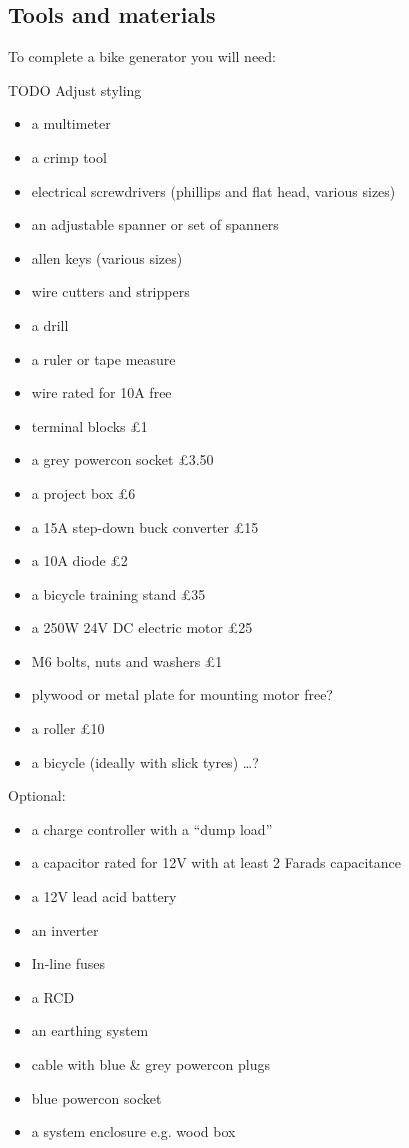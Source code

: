 \documentclass{article}
\theoremstyle{definition}
\theoremstyle{definition}
\theoremstyle{remark}
\begin{document}

  \subsection{Tools and materials} %
  \label{sub:tools_and_materials}

    To complete a bike generator you will need: 

    TODO Adjust styling

    \begin{itemize}
      \item a multimeter
      \item a crimp tool
      \item electrical screwdrivers (phillips and flat head, various sizes)
      \item an adjustable spanner or set of spanners
      \item allen keys (various sizes)
      \item wire cutters and strippers
      \item a drill
      \item a ruler or tape measure
      \item wire rated for 10A free
      \item terminal blocks £1
      \item a grey powercon socket £3.50
      \item a project box £6
      \item a 15A step-down buck converter £15
      \item a 10A diode £2
      \item a bicycle training stand £35
      \item a 250W 24V DC electric motor £25
      \item M6 bolts, nuts and washers £1
      \item plywood or metal plate for mounting motor free?
      \item a roller £10
      \item a bicycle (ideally with slick tyres) …?
    \end{itemize}

    Optional:

    \begin{itemize}
      \item a charge controller with a “dump load”
      \item a capacitor rated for 12V with at least 2 Farads capacitance
      \item a 12V lead acid battery
      \item an inverter
      \item In-line fuses
      \item a RCD
      \item an earthing system
      \item cable with blue \& grey powercon plugs
      \item blue powercon socket
      \item a system enclosure e.g. wood box
    \end{itemize}
\end{document}
